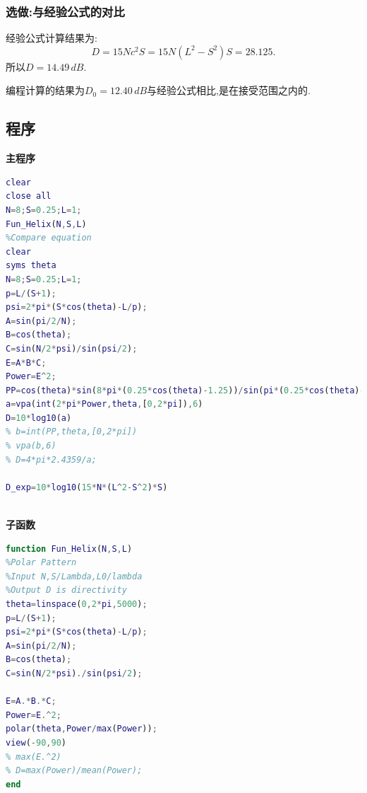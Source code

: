\subsubsection{选做:与经验公式的对比}
经验公式计算结果为:
\begin{equation}
D=15Nc^2 S=15N(L^2-S^2) S=28.125.
\end{equation}
所以$D=14.49\,dB$.


编程计算的结果为$D_0=12.40\,dB$与经验公式相比,是在接受范围之内的. 
\newpage
\subsection{程序}
\noindent \textbf{主程序}
\begin{lstlisting}[language={matlab},keywordstyle=\color{blue!70},commentstyle=\color{red!50!green!50!blue!50},frame=shadowbox, rulesepcolor=\color{red!20!green!20!blue!20}] 
clear
close all
N=8;S=0.25;L=1;
Fun_Helix(N,S,L)
%Compare equation
clear
syms theta
N=8;S=0.25;L=1;
p=L/(S+1);
psi=2*pi*(S*cos(theta)-L/p);
A=sin(pi/2/N);
B=cos(theta);
C=sin(N/2*psi)/sin(psi/2);
E=A*B*C;
Power=E^2;
PP=cos(theta)*sin(8*pi*(0.25*cos(theta)-1.25))/sin(pi*(0.25*cos(theta)-1.225));
a=vpa(int(2*pi*Power,theta,[0,2*pi]),6)
D=10*log10(a)
% b=int(PP,theta,[0,2*pi])
% vpa(b,6)
% D=4*pi*2.4359/a;

D_exp=10*log10(15*N*(L^2-S^2)*S)



\end{lstlisting}
\noindent \textbf{子函数}
\begin{lstlisting}[language={matlab},keywordstyle=\color{blue!70},commentstyle=\color{red!50!green!50!blue!50},frame=shadowbox, rulesepcolor=\color{red!20!green!20!blue!20}] 
function Fun_Helix(N,S,L)
%Polar Pattern
%Input N,S/Lambda,L0/lambda
%Output D is directivity
theta=linspace(0,2*pi,5000);
p=L/(S+1);
psi=2*pi*(S*cos(theta)-L/p);
A=sin(pi/2/N);
B=cos(theta);
C=sin(N/2*psi)./sin(psi/2);

E=A.*B.*C;
Power=E.^2;
polar(theta,Power/max(Power));
view(-90,90)
% max(E.^2)
% D=max(Power)/mean(Power);
end
\end{lstlisting}